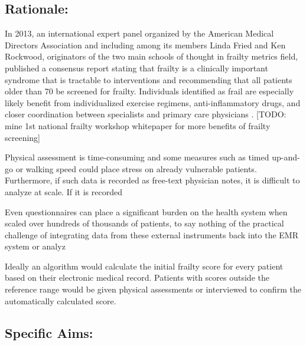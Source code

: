 \subsection{Rationale:}\label{rationale}
In 2013, an international expert panel organized by the American Medical Directors Association and including among its members Linda Fried and Ken Rockwood, originators of the two main schools of thought in frailty metrics field, published a consensus report \cite{Morley_2013} stating that frailty is a clinically important syndrome that is tractable to interventions and recommending that all patients older than 70 be screened for frailty. Individuals identified as frail are especially likely benefit from individualized exercise regimens, anti-inflammatory drugs, and closer coordination between specialists and primary care physicians \citep{16392724}. [TODO: mine 1st national frailty workshop whitepaper for more benefits of frailty screening]

Physical assessment is time-consuming and some measures such as timed up-and-go or walking speed \cite{10811152} could place stress on already vulnerable patients. Furthermore, if such data is recorded as free-text physician notes, it is difficult to analyze at scale. If it is recorded 

Even questionnaires can place a significant burden on the health system when scaled over hundreds of thousands of patients, to say nothing of the practical challenge of integrating data from these external instruments back into the EMR system or analyz

Ideally an algorithm would calculate the initial frailty score for every patient based on their electronic medical record. Patients with scores outside the reference range would be given physical assessments or interviewed to confirm the automatically calculated score.  

\subsection{Specific Aims:}\label{specific-aims}
